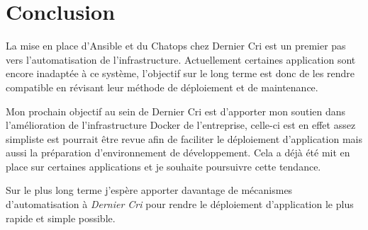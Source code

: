 \newpage

\section{Conclusion}\label{conclusion}

\bigskip

La mise en place d'Ansible et du Chatops chez Dernier Cri est un premier
pas vers l'automatisation de l'infrastructure. Actuellement certaines
application sont encore inadaptée à ce système, l'objectif sur le long
terme est donc de les rendre compatible en révisant leur méthode de
déploiement et de maintenance.

\bigskip

Mon prochain objectif au sein de Dernier Cri est d'apporter mon soutien
dans l'amélioration de l'infrastructure Docker de l'entreprise, celle-ci
est en effet assez simpliste est pourrait être revue afin de faciliter
le déploiement d'application mais aussi la préparation d'environnement
de développement. Cela a déjà été mit en place sur certaines
applications et je souhaite poursuivre cette tendance.

\bigskip

Sur le plus long terme j'espère apporter davantage de mécanismes
d'automatisation à \emph{Dernier Cri} pour rendre le déploiement
d'application le plus rapide et simple possible.
